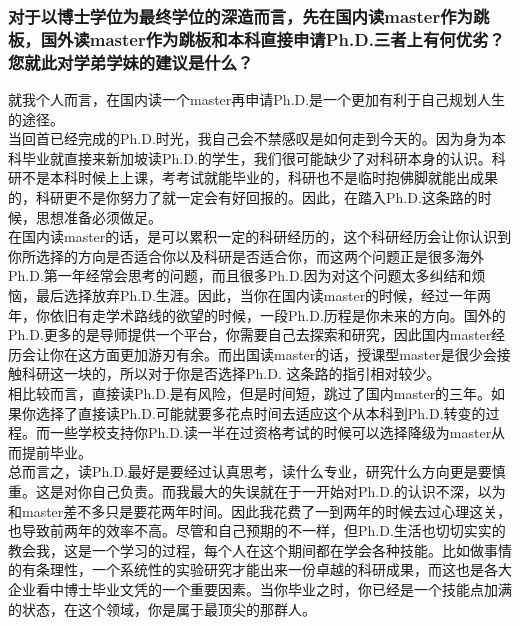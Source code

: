 \documentclass[a4paper,UTF8]{book}
\begin{document}
    \subsubsection*{对于以博士学位为最终学位的深造而言，先在国内读master作为跳板，国外读master作为跳板和本科直接申请Ph.D.三者上有何优劣？您就此对学弟学妹的建议是什么？}
    就我个人而言，在国内读一个master再申请Ph.D.是一个更加有利于自己规划人生的途径。  \\
    当回首已经完成的Ph.D.时光，我自己会不禁感叹是如何走到今天的。因为身为本科毕业就直接来新加坡读Ph.D.的学生，我们很可能缺少了对科研本身的认识。科研不是本科时候上上课，考考试就能毕业的，科研也不是临时抱佛脚就能出成果的，科研更不是你努力了就一定会有好回报的。因此，在踏入Ph.D.这条路的时候，思想准备必须做足。\\
    在国内读master的话，是可以累积一定的科研经历的，这个科研经历会让你认识到你所选择的方向是否适合你以及科研是否适合你，而这两个问题正是很多海外Ph.D.第一年经常会思考的问题，而且很多Ph.D.因为对这个问题太多纠结和烦恼，最后选择放弃Ph.D.生涯。因此，当你在国内读master的时候，经过一年两年，你依旧有走学术路线的欲望的时候，一段Ph.D.历程是你未来的方向。国外的Ph.D.更多的是导师提供一个平台，你需要自己去探索和研究，因此国内master经历会让你在这方面更加游刃有余。而出国读master的话，授课型master是很少会接触科研这一块的，所以对于你是否选择Ph.D. 这条路的指引相对较少。\\
    相比较而言，直接读Ph.D.是有风险，但是时间短，跳过了国内master的三年。如果你选择了直接读Ph.D.可能就要多花点时间去适应这个从本科到Ph.D.转变的过程。而一些学校支持你Ph.D.读一半在过资格考试的时候可以选择降级为master从而提前毕业。\\
    总而言之，读Ph.D.最好是要经过认真思考，读什么专业，研究什么方向更是要慎重。这是对你自己负责。而我最大的失误就在于一开始对Ph.D.的认识不深，以为和master差不多只是要花两年时间。因此我花费了一到两年的时候去过心理这关，也导致前两年的效率不高。尽管和自己预期的不一样，但Ph.D.生活也切切实实的教会我，这是一个学习的过程，每个人在这个期间都在学会各种技能。比如做事情的有条理性，一个系统性的实验研究才能出来一份卓越的科研成果，而这也是各大企业看中博士毕业文凭的一个重要因素。当你毕业之时，你已经是一个技能点加满的状态，在这个领域，你是属于最顶尖的那群人。
\end{document}
